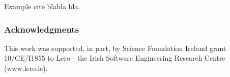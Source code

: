 \documentclass[runningheads,a4paper]{llncs}
\begin{document}
Example cite \cite{AbdelkaderLahmadi2005} blabla bla.



\subsubsection*{Acknowledgments}
This work was supported, in part, by Science Foundation Ireland grant 10/CE/I1855 to Lero - the Irish Software Engineering Research Centre (www.lero.ie).




\end{document}
